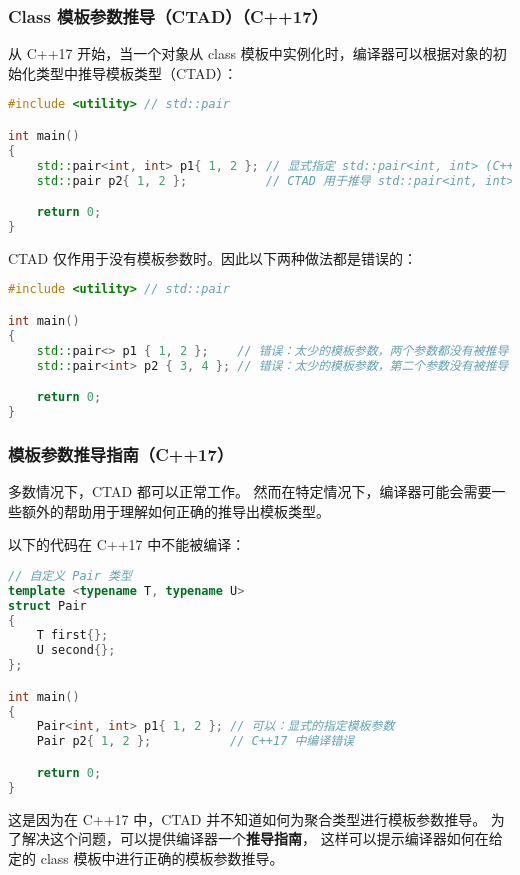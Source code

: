 \documentclass[../../LearnCpp.tex]{subfiles}
\begin{document}

\subsubsection*{Class 模板参数推导（CTAD）（C++17）}

从 C++17 开始，当一个对象从 class 模板中实例化时，编译器可以根据对象的初始化类型中推导模板类型（CTAD）：

\begin{lstlisting}[language=C++]
#include <utility> // std::pair

int main()
{
    std::pair<int, int> p1{ 1, 2 }; // 显式指定 std::pair<int, int> (C++11 onward)
    std::pair p2{ 1, 2 };           // CTAD 用于推导 std::pair<int, int> (C++17)

    return 0;
}
\end{lstlisting}

CTAD 仅作用于没有模板参数时。因此以下两种做法都是错误的：

\begin{lstlisting}[language=C++]
#include <utility> // std::pair

int main()
{
    std::pair<> p1 { 1, 2 };    // 错误：太少的模板参数，两个参数都没有被推导
    std::pair<int> p2 { 3, 4 }; // 错误：太少的模板参数，第二个参数没有被推导

    return 0;
}
\end{lstlisting}

\subsubsection*{模板参数推导指南（C++17）}

多数情况下，CTAD 都可以正常工作。
然而在特定情况下，编译器可能会需要一些额外的帮助用于理解如何正确的推导出模板类型。

以下的代码在 C++17 中不能被编译：

\begin{lstlisting}[language=C++]
// 自定义 Pair 类型
template <typename T, typename U>
struct Pair
{
    T first{};
    U second{};
};

int main()
{
    Pair<int, int> p1{ 1, 2 }; // 可以：显式的指定模板参数
    Pair p2{ 1, 2 };           // C++17 中编译错误

    return 0;
}
\end{lstlisting}

这是因为在 C++17 中，CTAD 并不知道如何为聚合类型进行模板参数推导。
为了解决这个问题，可以提供编译器一个\textbf{推导指南}，
这样可以提示编译器如何在给定的 class 模板中进行正确的模板参数推导。
\end{document}
